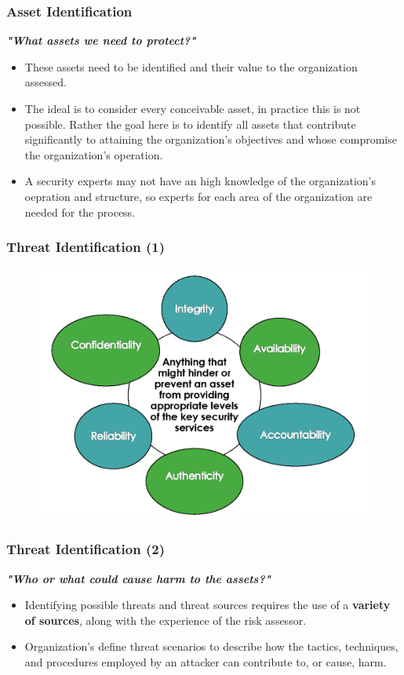 \documentclass[xcolor ={table,usenames,dvipsnames}]{beamer}
\theoremstyle{definition}
\begin{document}
	\begin{frame}
		\frametitle{Asset Identification}
		\textit{\textbf{"What assets we need to protect?"}}
		\begin{itemize}
			\item These assets need to be identified and their value to the organization assessed.
			\item The ideal is to consider every conceivable asset, in practice this is not possible. Rather the goal here is to identify all assets that contribute significantly to attaining the organization’s objectives and whose compromise the organization’s operation. 
			\item A security experts may not have an high knowledge of the organization's oepration and structure, so experts for each area of the organization are needed for the process.
		\end{itemize}
	\end{frame}
	
	\begin{frame}
		\frametitle{Threat Identification (1)}
			\begin{figure}[h!]
			\centering
			\includegraphics[scale=0.25]{img/img_12.PNG}
			\label{Interfacce di un CS}
		\end{figure}
	\end{frame}

	\begin{frame}
		\frametitle{Threat Identification (2)}
		\textbf{\textit{"Who or what could cause harm to the assets?"}}
		\begin{itemize}
			\item Identifying possible threats and threat sources requires the use of a \textbf{variety of sources}, along with the experience of the risk assessor. 
			\item  Organization’s define threat scenarios to describe how the tactics, techniques, and procedures employed by an attacker can contribute to, or cause, harm. 
		\end{itemize}
	\end{frame}
\end{document}
